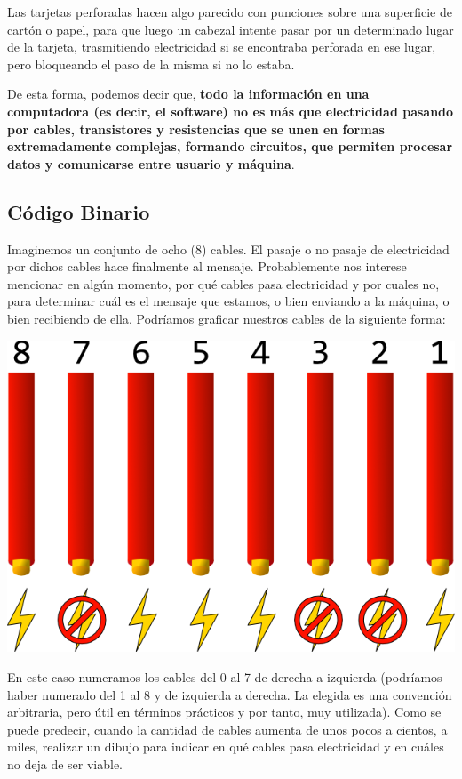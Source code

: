 Las tarjetas perforadas hacen algo parecido con punciones sobre una superficie
de cartón o papel, para que luego un cabezal intente pasar por un determinado
lugar de la tarjeta, trasmitiendo electricidad si se encontraba perforada en ese
lugar, pero bloqueando el paso de la misma si no lo estaba.

De esta forma, podemos decir que, \textbf{todo la información en una computadora
(es decir, el software) no es más que electricidad pasando por cables,
transistores y resistencias que se unen en formas extremadamente complejas,
formando circuitos, que permiten procesar datos y comunicarse entre usuario y
máquina}.\autocite[part. 2]{white_2015}


\subsection{Código Binario}
\label{chap:bajo_nivel:subsec:binario}

Imaginemos un conjunto de ocho (8) cables. El pasaje o no pasaje de electricidad
por dichos cables hace finalmente al mensaje. Probablemente nos interese
mencionar en algún momento, por qué cables pasa electricidad y por cuales no,
para determinar cuál es el mensaje que estamos, o bien enviando a la máquina, o
bien recibiendo de ella. Podríamos graficar nuestros cables de la siguiente
forma:

\centerline{\includegraphics[]{unidades/2_informacion/1_bajo_nivel/imagenes/cables_electricity.png}}

En este caso numeramos los cables del 0 al 7 de derecha a izquierda (podríamos
haber numerado del 1 al 8 y de izquierda a derecha. La elegida es una convención
arbitraria, pero útil en términos prácticos y por tanto, muy utilizada). Como se
puede predecir, cuando la cantidad de cables aumenta de unos pocos a cientos, a
miles, realizar un dibujo para indicar en qué cables pasa electricidad y en
cuáles no deja de ser viable.

